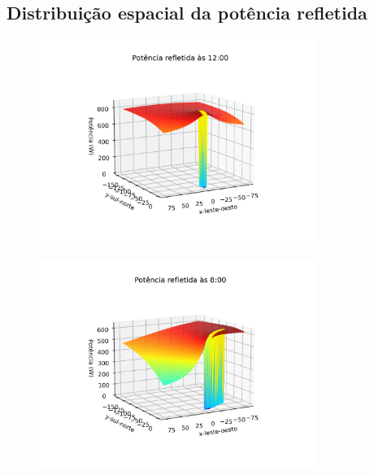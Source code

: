\documentclass[12pt,notheorems,hyperref={pdfauthor= Rafael Nardi}]{beamer}
\begin{document}
\subsection{Distribuição espacial da potência refletida}

\begin{frame}%
	\begin{figure}[htpb]
		\centering
		\includegraphics[width=0.8\textwidth]{../../plots/tower_shadow_correction/square_grid_12am.png}
		\label{fig:heliost_field_at_12pm}
	\end{figure}
\end{frame}

\begin{frame}%
	\begin{figure}[htpb]
		\centering
		\includegraphics[width=0.8\textwidth]{../../plots/tower_shadow_correction/square_grid_8am.png}
		\label{fig:heliost_field_at_8am}
	\end{figure}
\end{frame}
\end{document}
